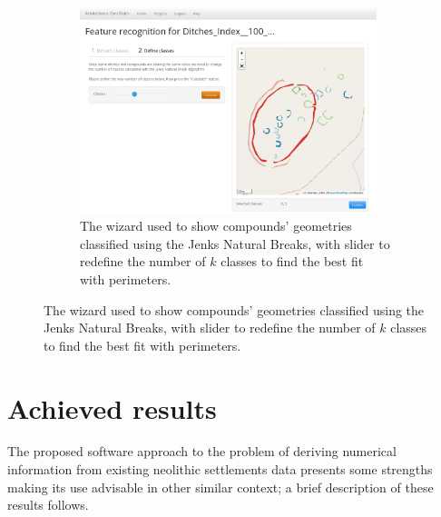             \vfill

            \begin{figure}[H]
                \ContinuedFloat
                \begin{subfigure}[b]{1\textwidth}
                    \centering
                    \includegraphics[width=0.95\textwidth]{img/shp-wizard}
                    \caption{The wizard used to show compounds' geometries classified using the Jenks Natural Breaks, with slider to redefine the number of $k$ classes to find the best fit with perimeters.}
                    \label{fig:shp-wizard}
                \end{subfigure}
            \end{figure}

            \vfill

        \section{Achieved results}
            The proposed software approach to the problem of deriving numerical information from existing neolithic settlements data presents some strengths making its use advisable in other similar context; a brief description of these results follows.

